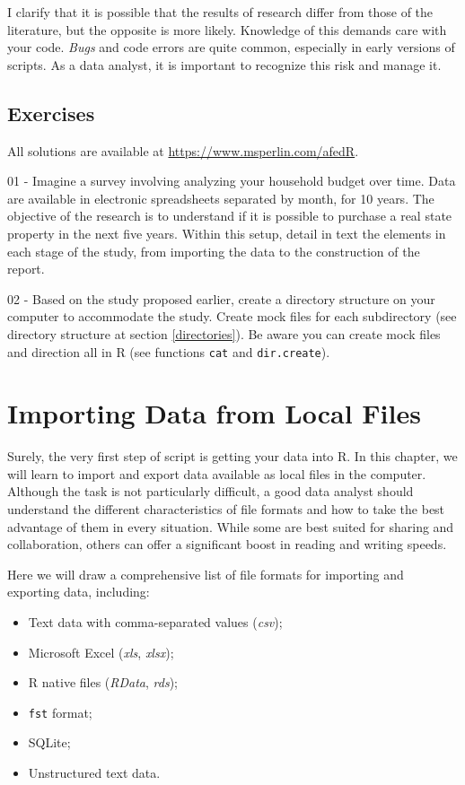 \documentclass[
  12pt,
]{book}
\providecommand{\tightlist}{%
  \setlength{\itemsep}{0pt}\setlength{\parskip}{0pt}}
\begin{document}
I clarify that it is possible that the results of research differ from those of the literature, but the opposite is more likely. Knowledge of this demands care with your code. \emph{Bugs} and code errors are quite common, especially in early versions of scripts. As a data analyst, it is important to recognize this risk and manage it.

\hypertarget{exercises-1}{%
\section{Exercises}\label{exercises-1}}

All solutions are available at \url{https://www.msperlin.com/afedR}.

01 -
Imagine a survey involving analyzing your household budget over time. Data are available in electronic spreadsheets separated by month, for 10 years. The objective of the research is to understand if it is possible to purchase a real state property in the next five years. Within this setup, detail in text the elements in each stage of the study, from importing the data to the construction of the report.

02 -
Based on the study proposed earlier, create a directory structure on your computer to accommodate the study. Create mock files for each subdirectory (see directory structure at section \ref{directories}). Be aware you can create mock files and direction all in R (see functions \texttt{cat} and \texttt{dir.create}).

\hypertarget{importing}{%
\chapter{Importing Data from Local Files}\label{importing}}

Surely, the very first step of script is getting your data into R. In this chapter, we will learn to import and export data available as local files in the computer. Although the task is not particularly difficult, a good data analyst should understand the different characteristics of file formats and how to take the best advantage of them in every situation. While some are best suited for sharing and collaboration, others can offer a significant boost in reading and writing speeds.

Here we will draw a comprehensive list of file formats for importing and exporting data, including:

\begin{itemize}
\tightlist
\item
  Text data with comma-separated values (\emph{csv});
\item
  Microsoft Excel (\emph{xls}, \emph{xlsx});
\item
  R native files (\emph{RData}, \emph{rds});
\item
  \texttt{fst} format;
\item
  SQLite;
\item
  Unstructured text data.
\end{itemize}
\end{document}
